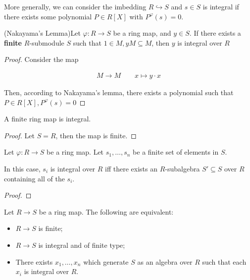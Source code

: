 \documentclass[Total.tex]{subfiles}
\begin{document}
			More generally, we can consider the imbedding $R\hookrightarrow S$ and $s\in S$ is integral if there exists some polynomial $P\in R[X]$ with $P^\varphi(s)=0$.
			
			\begin{lemma}
				(Nakayama's Lemma)Let $\varphi:R\rightarrow S$ be a ring map, and $y\in S$. If there exists a \textbf{finite} $R$-submodule $S$ such that $1\in M,yM\subseteq M$, then $y$ is integral over $R$
			\end{lemma}
			
			\begin{proof}
				Consider the map 
				
				\begin{gather*}
					M\rightarrow M\qquad x \mapsto y\cdot x 
				\end{gather*}
				
				Then, according to Nakayama's lemma, there exists a polynomial such that $P\in R[X],P^\varphi(s)=0$
			\end{proof}
			
			\begin{lemma}
				A finite ring map is integral. 
			\end{lemma}
			
			\begin{proof}
				Let $S=R$, then the map is finite. 
			\end{proof}
			
			\begin{lemma}
				Let $\varphi:R\rightarrow S$ be a ring map. Let $s_1,\dots,s_n$ be a finite set of elements in $S$. 
				
				In this case, $s_i$ is integral over $R$ iff there exists an $R$-subalgebra $S'\subseteq S$ over $R$ containing all of the $s_i$.
			\end{lemma}
			
			\begin{proof}
			\end{proof}
			
			\begin{lemma}
				Let $R\rightarrow S$ be a ring map. The following are equivalent:
				
				\begin{itemize}
					\item $R\rightarrow S$ is finite;
					\item $R\rightarrow S$ is integral and of finite type;
					\item There exists $x_1,\dots,x_n$ which generate $S$ as an algebra over $R$ such that each $x_i$ is integral over $R$.
				\end{itemize} 
			\end{lemma}
			
\end{document}

